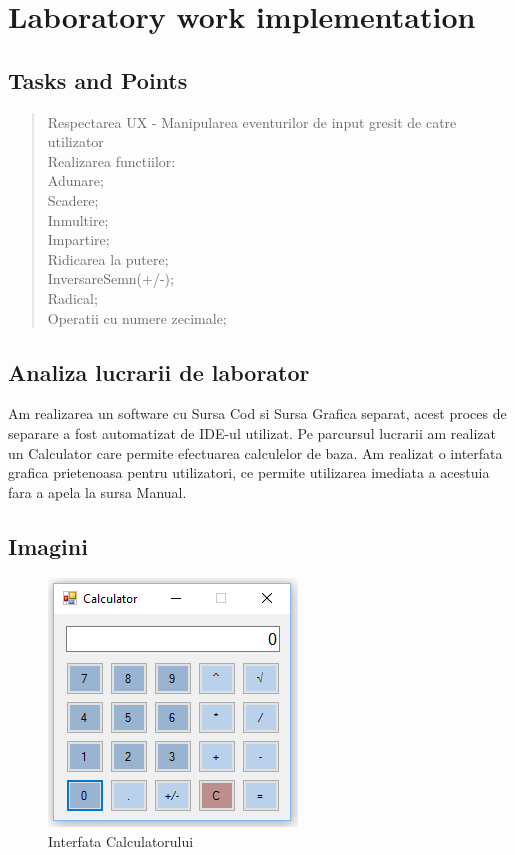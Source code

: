 \section{Laboratory work implementation}

\subsection{Tasks and Points}

\begin{quote}
\begin{description}

	 Respectarea UX - Manipularea eventurilor de input gresit de catre utilizator \\
	Realizarea functiilor:\\
	Adunare;\\
	Scadere;\\
	Inmultire;\\
	Impartire;\\
	Ridicarea la putere;\\
	InversareSemn(+/-);\\
	Radical;\\
	Operatii cu numere zecimale;\\

\end{description}
\end{quote}

\subsection{Analiza lucrarii de laborator}

Am realizarea un software cu Sursa Cod si Sursa Grafica separat, acest proces de separare a fost automatizat de IDE-ul utilizat. Pe parcursul lucrarii am realizat un Calculator care permite efectuarea calculelor de baza. Am realizat o interfata grafica prietenoasa pentru utilizatori, ce permite utilizarea imediata a acestuia fara a apela la sursa Manual.


\subsection{Imagini}
\begin{figure}[htb]
	\begin{center}
		\centering
		\includegraphics[scale = 1]{img/screenshot001.png}
		\caption{Interfata Calculatorului}%
		\label{fig:screenshot001}
	\end{center}
\end{figure}

\clearpage
